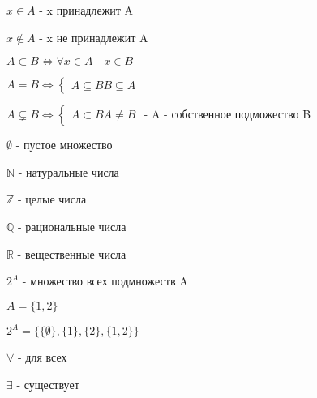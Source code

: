        
        $x \in A$ - x принадлежит A
        
        $x \not\in A$ - x не принадлежит A
        
        $A \subset B \iff  \forall{x \in A}\quad x \in B$
        
        $A = B \iff \begin{cases} A \subseteq B B \subseteq A \end{cases}$
        
        $A \subsetneq B \iff  \begin{cases} A \subset B A \neq B  \end{cases}$ - A - собственное подможество B
        
        $\emptyset$ - пустое множество
        
        $\mathbb{N}$ - натуральные числа
        
        $\mathbb{Z}$ - целые числа
        
        $\mathbb{Q}$ - рациональные числа
        
        $\mathbb{R}$ - вещественные числа
        
        $2^A$ - множество всех подмножеств A
        
        $A = \{1, 2\}$
        
        $2^{A} = \{\{\emptyset\}, \{1\}, \{2\}, \{1, 2\}\}$
        
        $\forall$ - для всех
        
        $\exists$ - существует

